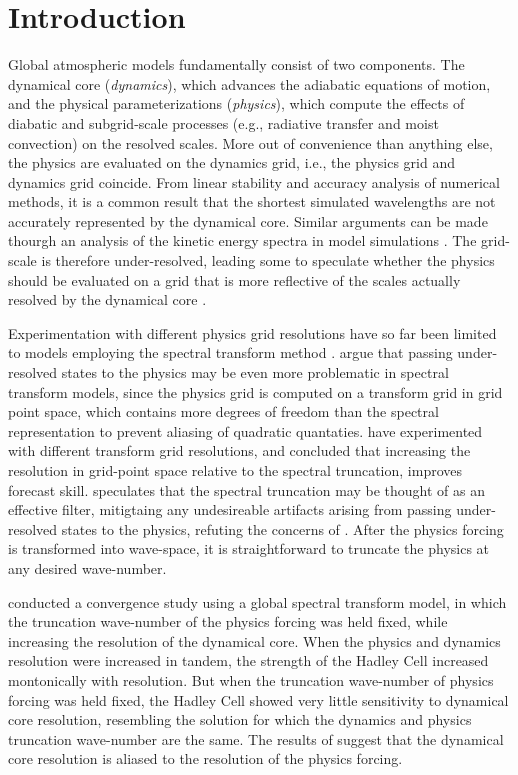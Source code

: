 \documentclass{agujournal}
\begin{document}
\section{Introduction}

Global atmospheric models fundamentally consist of two components. The dynamical core ({\em{dynamics}}), which advances the adiabatic equations of motion, and the physical parameterizations ({\em{physics}}), which compute the effects of diabatic and subgrid-scale processes (e.g., radiative transfer and moist convection) on the resolved scales. More out of convenience than anything else, the physics are evaluated on the dynamics grid, i.e., the physics grid and dynamics grid coincide. From linear stability and accuracy analysis of numerical methods, it is a common result that the shortest simulated wavelengths are not accurately represented by the dynamical core. Similar arguments can be made thourgh an analysis of the kinetic energy spectra in model simulations \citep{S2011LNCSE}. The grid-scale is therefore under-resolved, leading some to speculate whether the physics should be evaluated on a grid that is more reflective of the scales actually resolved by the dynamical core \citep{LH1997MWR,W2007JMSJ,S2011LNCSE}.

Experimentation with different physics grid resolutions have so far been limited to models employing the spectral transform method \citep{LH1997MWR,W1999T,W2014PTRSL}. \cite{LH1997MWR} argue that passing under-resolved states to the physics may be even more problematic in spectral transform models, since the physics grid is computed on a transform grid in grid point space, which contains more degrees of freedom than the spectral representation to prevent aliasing of quadratic quantaties. \cite{W2014PTRSL} have experimented with different transform grid resolutions, and concluded that increasing the resolution in grid-point space relative to the spectral truncation, improves forecast skill. \cite{W2014PTRSL} speculates that the spectral truncation may be thought of as an effective filter, mitigtaing any undesireable artifacts arising from passing under-resolved states to the physics, refuting the concerns of \cite{LH1997MWR}. After the physics forcing is transformed into wave-space, it is straightforward to truncate the physics at any desired wave-number. 

\cite{W1999T} conducted a convergence study using a global spectral transform model, in which the truncation wave-number of the physics forcing was held fixed, while increasing the resolution of the dynamical core. When the physics and dynamics resolution were increased in tandem, the strength of the Hadley Cell increased montonically with resolution. But when the truncation wave-number of physics forcing was held fixed, the Hadley Cell showed very little sensitivity to dynamical core resolution, resembling the solution for which the dynamics and physics truncation wave-number are the same. The results of \cite{W1999T} suggest that the dynamical core resolution is aliased to the resolution of the physics forcing. 
\end{document}
